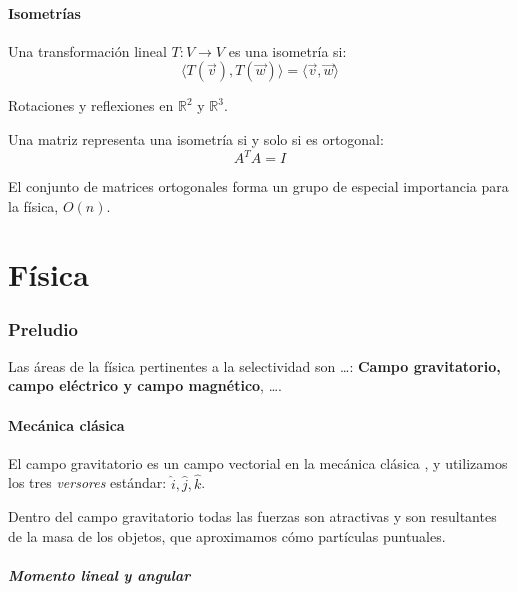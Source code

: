 \documentclass[10pt]{article}
\newcommand{\R}{\mathbb{R}}
\begin{document}
\subsection{Isometrías}

\begin{definition}[Isometría]
  Una transformación lineal $T : V \to V$ es una isometría si:
  \[
    \langle T(\vec{v}), T(\vec{w}) \rangle = \langle \vec{v}, \vec{w} \rangle
  \]
\end{definition}

\begin{example}
  Rotaciones y reflexiones en $\R^2$ y $\R^3$.
\end{example}

\begin{theorem}
  Una matriz representa una isometría si y solo si es ortogonal:
  \[
    A^T A = I
  \]
\end{theorem}

\begin{remark}
  El conjunto de matrices ortogonales forma un grupo de especial importancia para la física, $ O(n) $.
\end{remark}

\part{Física}

\section{Preludio}

Las áreas de la física pertinentes a la selectividad son \dots : \textbf{Campo gravitatorio, campo eléctrico y campo magnético}, \dots.

\subsection{Mecánica clásica}

El campo gravitatorio es un campo vectorial en la mecánica clásica , y utilizamos los tres \textit{versores}
estándar: $ \hat{i}, \hat{j}, \hat{k} $.

Dentro del campo gravitatorio todas las fuerzas son atractivas y son resultantes de la masa de los objetos, que aproximamos cómo partículas puntuales.

\subsubsection{Momento lineal y angular}
\end{document}
